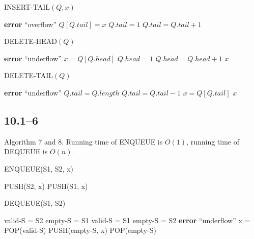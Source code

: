 \documentclass{article}
\begin{document}
\begin{algorithm}
  \caption{INSERT-TAIL$(Q, x)$}
  \begin{algorithmic}[1]
    \STATE \textbf{error} ``overflow''
    \ENDIF
    \STATE $Q[Q.tail] = x$
    \STATE $Q.tail = 1$
    \ELSE
    \STATE $Q.tail = Q.tail + 1$
    \ENDIF
  \end{algorithmic}
\end{algorithm}

\begin{algorithm}
  \caption{DELETE-HEAD$(Q)$}
  \begin{algorithmic}[1]
    \STATE \textbf{error} ``underflow''
    \ENDIF
    \STATE $x = Q[Q.head]$
    \STATE $Q.head = 1$
    \ELSE
    \STATE $Q.head = Q.head + 1$
    \ENDIF
    \RETURN $x$
  \end{algorithmic}
\end{algorithm}

\begin{algorithm}
  \caption{DELETE-TAIL$(Q)$}
  \begin{algorithmic}[1]
    \STATE \textbf{error} ``underflow''
    \ENDIF
    \STATE $Q.tail = Q.length$
    \ELSE
    \STATE $Q.tail = Q.tail - 1$
    \ENDIF
    \STATE $x = Q[Q.tail]$
    \RETURN $x$
  \end{algorithmic}
\end{algorithm}

\subsection*{10.1--6}
Algorithm 7 and 8. Running time of ENQUEUE is $O(1)$, running time of DEQUEUE is $O(n)$.
\begin{algorithm}
  \caption{ENQUEUE(S1, S2, x)}
  \begin{algorithmic}[1]
    \STATE PUSH(S2, x)
    \ELSE
    \STATE PUSH(S1, x)
    \ENDIF
  \end{algorithmic}
\end{algorithm}

\begin{algorithm}
  \caption{DEQUEUE(S1, S2)}
  \begin{algorithmic}[1]
    \STATE valid-S = S2
    \STATE empty-S = S1
    \STATE valid-S = S1
    \STATE empty-S = S2
    \ELSE
    \STATE \textbf{error} ``underflow''
    \ENDIF
    \STATE x = POP(valid-S)
    \STATE PUSH(empty-S, x)
    \ENDWHILE
    \RETURN POP(empty-S)
  \end{algorithmic}
\end{algorithm}
\end{document}
